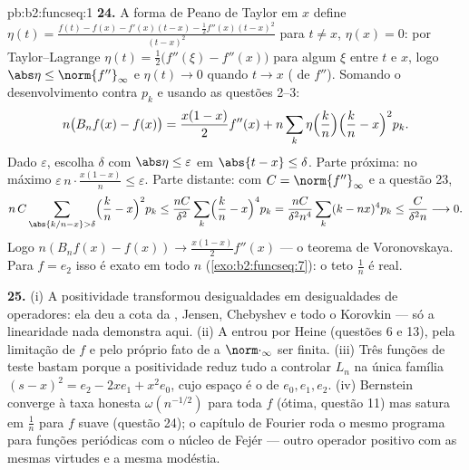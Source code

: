 \begin{solution}{pb:b2:funcseq:1}
\textbf{24.} A forma de Peano de Taylor em $x$ define $\eta(t) =
\frac{f(t) - f(x) - f'(x)(t-x) - \frac12f''(x)(t-x)^2}
{(t-x)^2}$ para $t \neq x$, $\eta(x) = 0$: por Taylor--Lagrange
$\eta(t) = \frac12\bigl(f''(\xi) - f''(x)\bigr)$ para algum $\xi$
entre $t$ e $x$, logo $\abs\eta \leq \norm{f''}_\infty$ e
$\eta(t) \to 0$ quando $t \to x$ ( de $f''$). Somando
o desenvolvimento contra $p_k$ e usando as questões 2--3:
\[
n\bigl(B_nf(x) - f(x)\bigr)
= \frac{x(1-x)}{2}f''(x)
+ n\sum_k\eta\Bigl(\frac kn\Bigr)\Bigl(\frac kn -
x\Bigr)^2p_k .
\]
Dado $\varepsilon$, escolha $\delta$ com $\abs\eta \leq
\varepsilon$ em $\abs{t - x}\leq\delta$. Parte próxima: no máximo
$\varepsilon\,n\cdot\frac{x(1-x)}n \leq \varepsilon$. Parte distante:
com $C = \norm{f''}_\infty$ e a questão 23,
\[
n\,C\sum_{\abs{k/n-x}>\delta}\Bigl(\frac kn -
x\Bigr)^2p_k
\leq \frac{nC}{\delta^2}\sum_k\Bigl(\frac kn -
x\Bigr)^4p_k
= \frac{nC}{\delta^2 n^4}\sum_k(k-nx)^4p_k
\leq \frac{C}{\delta^2 n} \longrightarrow 0 .
\]
Logo $n(B_nf(x) - f(x)) \to \frac{x(1-x)}2f''(x)$ ---
o teorema de Voronovskaya. Para $f = e_2$ isso é exato em todo
$n$ (\cref{exo:b2:funcseq:7}): o teto $\frac1n$ é real.

\textbf{25.} (i) A positividade transformou desigualdades  em
desigualdades de operadores: ela deu a cota da , Jensen,
Chebyshev e todo o Korovkin --- só a linearidade nada demonstra
aqui. (ii) A  entrou por Heine (questões
6 e 13), pela limitação de $f$ e pelo próprio fato de a 
$\norm\cdot_\infty$ ser finita. (iii) Três funções de teste
bastam porque a positividade reduz tudo a controlar
$L_n$ na única família $(s-x)^2 = e_2 - 2xe_1 + x^2e_0$,
cujo espaço  é o de $e_0, e_1, e_2$. (iv) Bernstein converge
à taxa honesta $\omega(n^{-1/2})$ para toda $f$ 
(ótima, questão 11) mas satura em $\frac1n$ para $f$ suave
(questão 24); o capítulo de Fourier roda o mesmo programa para
funções periódicas com o núcleo de Fejér --- outro operador
positivo com as mesmas virtudes e a mesma modéstia.
\end{solution}
